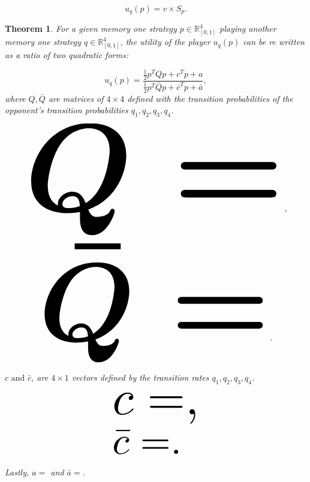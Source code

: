 \documentclass[10pt]{article}
\newtheorem{theorem}{Theorem}
\begin{document}
\begin{equation}\label{eq:press_dyson_utility}
    u_q(p) = v \times S_p.
\end{equation}

\begin{theorem}\label{theorem:quadratic_form_u}
    For a given memory one strategy \(p\in\mathbb{R}_{[0,1]}^4\) playing another 
    memory one strategy \(q\in\mathbb{R}_{[0,1]}^4\), the 
    utility of the player \(u_q(p)\) can be re written as a ratio of two quadratic
    forms:
    
    \begin{equation}\label{eq:optimisation_quadratic}
    u_q(p) = \frac{\frac{1}{2}p^TQp + c^Tp + a}
                {\frac{1}{2}p^T\bar{Q}p + \bar{c}^Tp + \bar{a}}, 
    \end{equation}
    where \(Q, \bar{Q}\) are matrices of \(4 \times 4\) defined with the transition
    probabilities of the opponent's transition probabilities \(q_1, q_2, q_3, q_4\).
    
    \begin{center}
    \begin{equation}
    \resizebox{0.9\linewidth}{!}{\arraycolsep=2.5pt%
    \boldmath\(
    Q = \)},
    \end{equation}
    \begin{equation}\label{eq:q_bar_matrix}
    \resizebox{0.8\linewidth}{!}{\arraycolsep=2.5pt%
    \boldmath\(
    \bar{Q} =  \)}.
    \end{equation}
    \end{center}
    
    \(c \text{ and } \bar{c}\), are \(4 \times 1\) vectors defined by the transition rates 
    \(q_1, q_2, q_3, q_4\).
    
    \begin{equation}\label{eq:q_matrix_numerator}
    \resizebox{0.3\linewidth}{!}{\arraycolsep=2.5pt%
    \(c = \),}
    \end{equation}
    \begin{equation}\label{eq:q_matrix_denominator}
    \resizebox{0.3\linewidth}{!}{\arraycolsep=2.5pt%
    \(\bar{c} = \).
    }
    \end{equation}
    
    Lastly, \(a = \) and 
    \(\bar{a} = \).
    \end{theorem}
\end{document}
